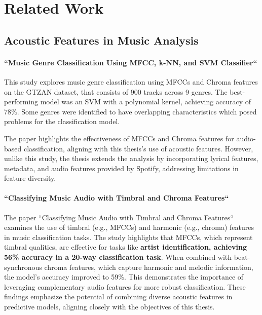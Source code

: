 \chapter{Related Work}
\label{cha:literaturereview}


\section{Acoustic Features in Music Analysis}
\label{sec:acousticfeaturesinmusicanalysis}

\subsubsection*{``Music Genre Classification Using MFCC, k-NN, and SVM
Classifier``}


This study explores music genre classification using MFCCs and Chroma features
on the GTZAN dataset, that consists of 900 tracks across 9 genres. The
best-performing model was an SVM with a polynomial kernel, achieving accuracy
of 78\%. Some genres were identified to have overlapping characteristics which
posed problems for the classification model.\cite{music_genre_classification_mfcc}

The paper highlights the effectiveness of MFCCs and Chroma features for
audio-based classification, aligning with this thesis's use of acoustic
features. However, unlike this study, the thesis extends the analysis by
incorporating lyrical features, metadata, and audio features provided by
Spotify, addressing limitations in feature diversity.

\subsubsection*{``Classifying Music Audio with Timbral and Chroma Features``}

The paper ``Classifying Music Audio with Timbral and Chroma Features`` examines
the use of timbral (e.g., MFCCs) and harmonic (e.g., chroma) features in music
classification tasks. The study highlights that MFCCs, which represent timbral
qualities, are effective for tasks like \textbf{artist identification, achieving 56\%
accuracy in a 20-way classification task}. When combined with beat-synchronous
chroma features, which capture harmonic and melodic information, the model's
accuracy improved to 59\%. This demonstrates the importance of leveraging
complementary audio features for more robust classification. These findings
emphasize the potential of combining diverse acoustic features in predictive
models, aligning closely with the objectives of this thesis.\cite{classifying_music_audio}



